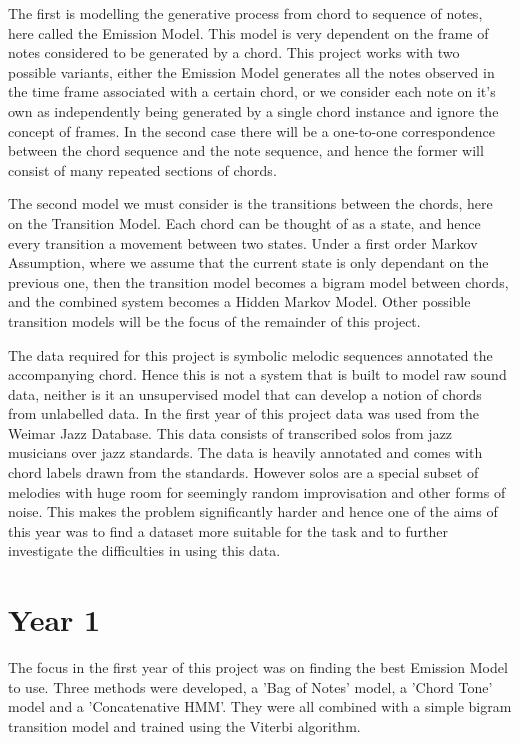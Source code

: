 \documentclass[bsc,singlespacing,parskip, deptreport]{infthesis}
\begin{document}
The first is modelling the generative process from chord to sequence of notes, here called the Emission Model. This model is very dependent on the frame of notes considered to be generated by a chord. This project works with two possible variants, either the Emission Model generates all the notes observed in the time frame associated with a certain chord, or we consider each note on it's own as independently being generated by a single chord instance and ignore the concept of frames. In the second case there will be a one-to-one correspondence between the chord sequence and the note sequence, and hence the former will consist of many repeated sections of chords.

The second model we must consider is the transitions between the chords, here on the Transition Model. Each chord can be thought of as a state, and hence every transition a movement between two states. Under a first order Markov Assumption, where we assume that the current state is only dependant on the previous one, then the transition model becomes a bigram model between chords, and the combined system becomes a Hidden Markov Model. Other possible transition models will be the focus of the remainder of this project. 

The data required for this project is symbolic melodic sequences annotated the accompanying chord. Hence this is not a system that is built to model raw sound data, neither is it an unsupervised model that can develop a notion of chords from unlabelled data. In the first year of this project data was used from the Weimar Jazz Database. This data consists of transcribed solos from jazz musicians over jazz standards. The data is heavily annotated and comes with chord labels drawn from the standards. However solos are a special subset of melodies with huge room for seemingly random improvisation and other forms of noise. This makes the problem significantly harder and hence one of the aims of this year was to find a dataset more suitable for the task and to further investigate the difficulties in using this data. 

\chapter{Year 1}

The focus in the first year of this project was on finding the best Emission Model to use. Three methods were developed, a 'Bag of Notes' model, a 'Chord Tone' model and a 'Concatenative HMM'. They were all combined with a simple bigram transition model and trained using the Viterbi algorithm.
\end{document}
